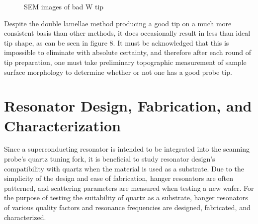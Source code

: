 \documentclass[11pt]{article}
\numberwithin{equation}{section}
\begin{document}
\begin{figure}%
    \centering
    \qquad
    \caption{SEM images of bad W tip}%
    \label{fig:example}%
\end{figure} 

Despite the double lamellae method producing a good tip on a much more consistent basis than other methods, it does occasionally result in less than ideal tip shape, as can be seen in figure 8.  It must be acknowledged that this is impossible to eliminate with absolute certainty, and therefore after each round of tip preparation, one must take preliminary topographic measurement of sample surface morphology to determine whether or not one has a good probe tip. \\

\section{Resonator Design, Fabrication, and Characterization} 

\hspace{\parindent}
Since a superconducting resonator is intended to be integrated into the scanning probe's quartz tuning fork, it is beneficial to study resonator design's compatibility with quartz when the material is used as a substrate.  Due to the simplicity of the design and ease of fabrication, hanger resonators are often patterned, and scattering parameters are measured when testing a new wafer.  For the purpose of testing the suitability of quartz as a substrate, hanger resonators of various quality factors and resonance frequencies are designed, fabricated, and characterized.   \\
\end{document}
